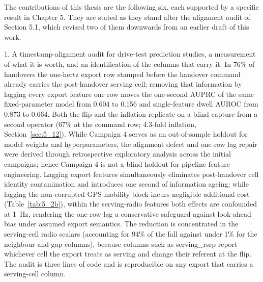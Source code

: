 The contributions of this thesis are the following six, each supported by a specific result in Chapter 5. They are stated as they stand after the alignment audit of Section 5.1, which revised two of them downwards from an earlier draft of this work.

1. A timestamp-alignment audit for drive-test prediction studies, a measurement of what it is worth, and an identification of the columns that carry it. In 76\% of handovers the one-hertz export row stamped before the handover command already carries the post-handover serving cell; removing that information by lagging every export feature one row moves the one-second AUPRC of the same fixed-parameter model from 0.604 to 0.156 and single-feature dwell AUROC from 0.873 to 0.664. Both the flip and the inflation replicate on a blind capture from a second operator (67\% at the command row; 4.3-fold inflation, Section~\ref{sec:5_12}). While Campaign 4 serves as an out-of-sample holdout for model weights and hyperparameters, the alignment defect and one-row lag repair were derived through retrospective exploratory analysis across the initial campaigns; hence Campaign 4 is not a blind holdout for pipeline feature engineering. Lagging export features simultaneously eliminates post-handover cell identity contamination and introduces one second of information ageing; while lagging the non-corrupted GPS mobility block incurs negligible additional cost (Table~\ref{tab:5_2b}), within the serving-radio features both effects are confounded at 1~Hz, rendering the one-row lag a conservative safeguard against look-ahead bias under assumed export semantics. The reduction is concentrated in the serving-cell radio scalars (accounting for 94\% of the fall against under 1\% for the neighbour and gap columns), because columns such as serving\_rsrp report whichever cell the export treats as serving and change their referent at the flip. The audit is three lines of code and is reproducible on any export that carries a serving-cell column.

